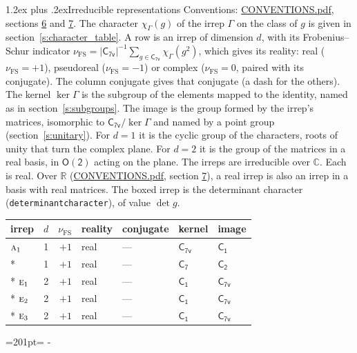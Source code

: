 \documentclass[10pt,a4paper]{article}
\makeatletter
\renewcommand\section{\@startsection{section}{1}{\z@}{-3ex plus -1ex minus -.2ex}%
  {1.2ex plus .2ex}{\normalfont\large\sffamily\bfseries\color{parttitle}}}
\newcommand{\needspace}[1]{\par\penalty-100\begingroup\dimen0=#1\relax\dimen2=\pagegoal
  \advance\dimen2-\pagetotal\ifdim\dimen0>\dimen2\relax\ifdim\dimen2>0pt\vfil\break\fi\fi
  \endgroup}
\numberwithin{equation}{section}
\newcommand{\grp}[1]{\mathsf{#1}}
\newcommand{\irr}[1]{\text{\normalfont\scshape #1}}
\newcommand{\detbox}[1]{{\setlength{\fboxsep}{1pt}\fbox{#1}}}
\newcommand{\irchar}[1]{\chi_{#1}}
\newcommand{\fsind}{\nu_{\mathrm{FS}}}
\makeatother
\begin{document}
\section{Irreducible representations}\label{s:irreps}
Conventions: \href{../../CONVENTIONS.pdf}{CONVENTIONS.pdf}, sections \href{../../CONVENTIONS.pdf\#conv.6}{6} and \href{../../CONVENTIONS.pdf\#conv.7}{7}.
\leavevmode\label{n:function.character}\label{n:irrep.Gamma}The character $\irchar{\Gamma}(g)$ of the irrep $\Gamma$ on the class of $g$ is given in section~\ref{s:character_table}.
\leavevmode\label{n:index.dimension}\label{n:index.frobenius}\label{n:head.irrep}\label{n:head.reality}A row is an irrep of dimension $d$, with its Frobenius--Schur indicator $\fsind = |\grp{C_{7v}}|^{-1}\allowbreak\sum_{g\in\grp{C_{7v}}}\irchar{\Gamma}(g^2)$, which gives its reality: real ($\fsind = +1$), pseudoreal ($\fsind = -1$) or complex ($\fsind = 0$, paired with its conjugate). \label{n:head.conjugate}The column conjugate gives that conjugate (a dash for the others). \label{n:head.kernel}The kernel $\ker\Gamma$ is the subgroup of the elements mapped to the identity, named as in section~\ref{s:subgroups}. \label{n:head.image}The image is the group formed by the irrep's matrices, isomorphic to $\grp{C_{7v}}/\ker\Gamma$ and named by a point group (section~\ref{s:unitary}). For $d = 1$ it is the cyclic group of the characters, roots of unity that turn the complex plane. For $d = 2$ it is the group of the matrices in a real basis, in $\grp{O(2)}$ acting on the plane. The irreps are irreducible over $\mathbb{C}$. Each is real. Over $\mathbb{R}$ (\href{../../CONVENTIONS.pdf}{CONVENTIONS.pdf}, section \href{../../CONVENTIONS.pdf\#conv.7}{7}), a real irrep is also an irrep in a basis with real matrices. \label{n:mark.determinant}The boxed irrep is the determinant character (\texttt{determinantcharacter}), of value $\det g$.
\setlength{\emergencystretch}{2em}\par\setlength{\emergencystretch}{0pt}
{\small\renewcommand{\arraystretch}{1.25}\begin{longtable}{@{}lrrllll@{}}\toprule
irrep & $d$ & $\fsind$ & reality & conjugate & kernel & image\\\midrule\endhead
\bottomrule\endfoot\endlastfoot
$\irr{a}_{1}$ & 1 & $+1$ & real & --- & \href{C7v.pdf}{$\grp{C_{7v}}$} & \href{C1.pdf}{$\grp{C_{1}}$}\\*
\detbox{$\irr{a}_{2}$} & 1 & $+1$ & real & --- & \href{C7.pdf}{$\grp{C_{7}}$} & \href{C2.pdf}{$\grp{C_{2}}$}\\*
$\irr{e}_{1}$ & 2 & $+1$ & real & --- & \href{C1.pdf}{$\grp{C_{1}}$} & \href{C7v.pdf}{$\grp{C_{7v}}$}\\*
$\irr{e}_{2}$ & 2 & $+1$ & real & --- & \href{C1.pdf}{$\grp{C_{1}}$} & \href{C7v.pdf}{$\grp{C_{7v}}$}\\*
$\irr{e}_{3}$ & 2 & $+1$ & real & --- & \href{C1.pdf}{$\grp{C_{1}}$} & \href{C7v.pdf}{$\grp{C_{7v}}$}\\
\bottomrule\end{longtable}}
\needspace{201pt}
\end{document}
